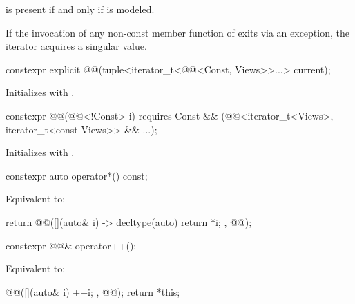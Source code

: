 \pnum
{} is present
if and only if  is modeled.

\pnum
If the invocation of any non-const member function of 
exits via an exception,
the iterator acquires a singular value.

\begin{itemdecl}
constexpr explicit @@(tuple<iterator_t<@@<Const, Views>>...> current);
\end{itemdecl}

\begin{itemdescr}
\pnum
\effects
Initializes  with .
\end{itemdescr}

\begin{itemdecl}
constexpr @@(@@<!Const> i)
  requires Const && (@@<iterator_t<Views>, iterator_t<const Views>> && ...);
\end{itemdecl}

\begin{itemdescr}
\pnum
\effects
Initializes  with .
\end{itemdescr}

\begin{itemdecl}
constexpr auto operator*() const;
\end{itemdecl}

\begin{itemdescr}
\pnum
\effects
Equivalent to:
\begin{codeblock}
return @@([](auto& i) -> decltype(auto) { return *i; }, @@);
\end{codeblock}
\end{itemdescr}

\begin{itemdecl}
constexpr @@& operator++();
\end{itemdecl}

\begin{itemdescr}
\pnum
\effects
Equivalent to:
\begin{codeblock}
@@([](auto& i) { ++i; }, @@);
return *this;
\end{codeblock}
\end{itemdescr}

